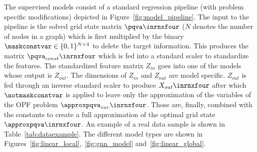 The supervised models consist of a standard regression pipeline (with problem specific modifications) depicted in
Figure~\ref{fig:model_pipeline}.
The input to the pipeline is the solved grid state matrix $\pqva \inrnxfour$ ($N$ denotes the number of nodes in a graph) which
is first multiplied by the binary $\maskconstvar \in \{0, 1\}^{N \times 4}$ to delete the target information.
This produces the matrix $\pqva_{const} \inrnxfour$ which is fed into a standard scaler to standardize the features.
The standardized feature matrix $Z_{in}$ goes into one of the models whose output is $Z_{out}$.
The dimensions of $Z_{in}$ and $Z_{out}$ are model specific.
$Z_{out}$ is fed through an inverse
standard scaler to produce $X_{out} \inrnxfour$ after which $\notmaskconstvar$ is applied to leave only the
approximation of the variables of the OPF problem $\approxpqva_{var} \inrnxfour$.
Those are, finally, combined with the constants to create a full approximation of the optimal grid state $\approxpqva \inrnxfour$.
An example of a real data sample is shown in Table~\ref{tab:dataexample}.
The different model types are shown in Figures~\ref{fig:linear_local},~\ref{fig:gnn_model} and~\ref{fig:linear_global}.

\mbox{}\\

